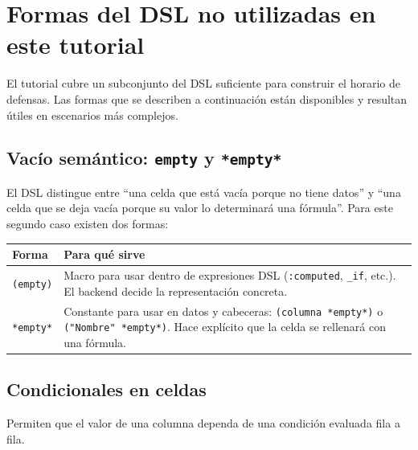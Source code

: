 \documentclass[12pt,a4paper]{report}
\begin{document}
\section{Formas del DSL no utilizadas en este tutorial}
\label{sec:macros-extra}

El tutorial cubre un subconjunto del DSL suficiente para construir el horario
de defensas. Las formas que se describen a continuación están disponibles y
resultan útiles en escenarios más complejos.

\subsection*{Vacío semántico: \texttt{empty} y \texttt{*empty*}}

El DSL distingue entre ``una celda que está vacía porque no tiene datos''
y ``una celda que se deja vacía porque su valor lo determinará una
fórmula''.  Para este segundo caso existen dos formas:

\begin{center}
\begin{tabular}{lp{8cm}}
\toprule
\textbf{Forma} & \textbf{Para qué sirve} \\
\midrule
\texttt{(empty)} & Macro para usar dentro de expresiones DSL
  (\texttt{:computed}, \texttt{\_if}, etc.).  El backend decide
  la representación concreta. \\
\texttt{*empty*} & Constante para usar en datos y cabeceras:
  \texttt{(columna *empty*)} o \texttt{("Nombre" *empty*)}.
  Hace explícito que la celda se rellenará con una fórmula. \\
\bottomrule
\end{tabular}
\end{center}

\subsection*{Condicionales en celdas}

Permiten que el valor de una columna dependa de una condición evaluada fila
a fila.
\end{document}
